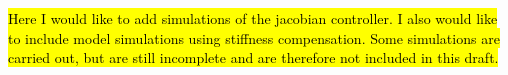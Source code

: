 \hl{Here I would like to add simulations of the jacobian controller. I also would like to include model simulations using stiffness compensation. Some simulations are carried out, but are still incomplete and are therefore not included in this draft.}





































